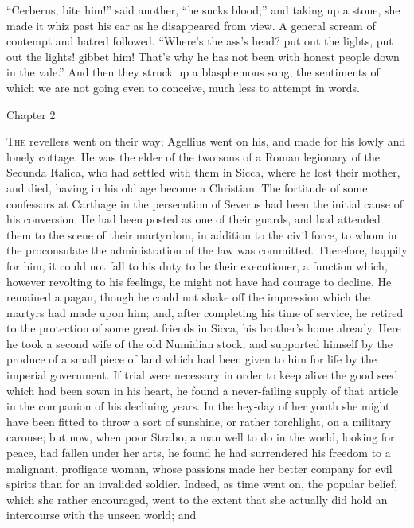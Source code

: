 ``Cerberus, bite him!'' said another, ``he sucks
blood;'' and taking up a stone, she made it whiz past his ear as
he disappeared from view. A general scream of contempt and hatred
followed. ``Where's the ass's head? put out the lights, put out
the lights! gibbet him! That's why he has not been with honest people down in the vale.'' And then they struck up a blasphemous
song, the sentiments of which we are not going even to conceive, much
less to attempt in words.

Chapter 2


T\textsc{he} revellers went on their way; Agellius went on his, and
made for his lowly and lonely cottage. He was the elder of the two
sons of a Roman legionary of the Secunda Italica, who had settled with
them in Sicca, where he lost their mother, and died, having in his old
age become a Christian. The fortitude of some confessors at Carthage
in the persecution of Severus had been the initial cause of his
conversion. He had been posted as one of their guards, and had
attended them to the scene of their martyrdom, in addition to the
civil force, to whom in the proconsulate the administration of the law
was committed. Therefore, happily for him, it could not fall to his
duty to be their executioner, a function which, however revolting to
his feelings, he might not have had courage to decline. He remained a
pagan, though he could not shake off the impression which the martyrs
had made upon him; and, after completing his time of service, he
retired to the protection of some great friends in Sicca, his brother's
home already. Here he took a second wife of the old Numidian stock,
and supported himself by the produce of a small piece of land which
had been given to him for life by the imperial government. If
trial were necessary in order to keep alive the good seed which had
been sown in his heart, he found a never-failing supply of that
article in the companion of his declining years. In the hey-day of her
youth she might have been fitted to throw a sort of sunshine, or
rather torchlight, on a military carouse; but now, when poor Strabo, a
man well to do in the world, looking for peace, had fallen under her
arts, he found he had surrendered his freedom to a malignant,
profligate woman, whose passions made her better company for evil
spirits than for an invalided soldier. Indeed, as time went on, the
popular belief, which she rather encouraged, went to the extent that
she actually did hold an intercourse with the unseen world; and
